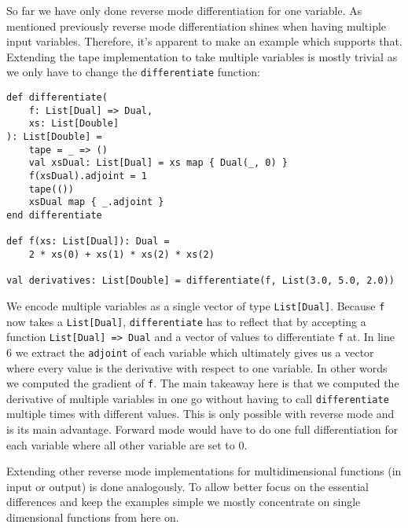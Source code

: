 So far we have only done reverse mode differentiation for one variable. As mentioned previously reverse mode differentiation shines when having multiple input variables. Therefore, it's apparent to make an example which supports that. Extending the tape implementation to take multiple variables is mostly trivial as we only have to change the \lstinline{differentiate} function:
\begin{lstlisting}
def differentiate(
    f: List[Dual] => Dual, 
    xs: List[Double]
): List[Double] =
    tape = _ => ()
    val xsDual: List[Dual] = xs map { Dual(_, 0) }
    f(xsDual).adjoint = 1
    tape(())
    xsDual map { _.adjoint }
end differentiate

def f(xs: List[Dual]): Dual =
    2 * xs(0) + xs(1) * xs(2) * xs(2)

val derivatives: List[Double] = differentiate(f, List(3.0, 5.0, 2.0))
\end{lstlisting}
We encode multiple variables as a single vector of type \lstinline{List[Dual]}. Because \lstinline{f} now takes a \lstinline{List[Dual]}, \lstinline{differentiate} has to reflect that by accepting a function \lstinline{List[Dual] => Dual} and a vector of values to differentiate \lstinline{f} at. In line 6 we extract the \lstinline{adjoint} of each variable which ultimately gives us a vector where every value is the derivative with respect to one variable. In other words we computed the gradient of \lstinline{f}. The main takeaway here is that we computed the derivative of multiple variables in one go without having to call \lstinline{differentiate} multiple times with different values. This is only possible with reverse mode and is its main advantage. Forward mode would have to do one full differentiation for each variable where all other variable are set to 0.

Extending other reverse mode implementations for multidimensional functions (in input or output) is done analogously. To allow better focus on the essential differences and keep the examples simple we mostly concentrate on single dimensional functions from here on.